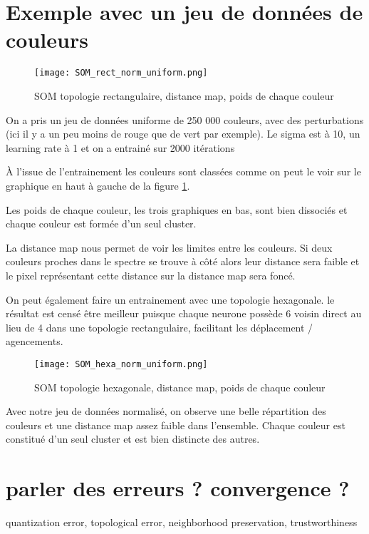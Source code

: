 \documentclass[12pt]{article}
\numberwithin{equation}{section} %
\begin{document}
\newpage
\section{Exemple avec un jeu de données de couleurs}
\begin{figure}[h!] 
	\center
	\label{fig1}
	\texttt{[image: SOM\_rect\_norm\_uniform.png]}
	\caption{SOM topologie rectangulaire, distance map, poids de chaque couleur}
\end{figure}

On a pris un jeu de données uniforme de 250 000 couleurs, avec des perturbations (ici il y a un peu moins de rouge que de vert par exemple). Le sigma est à 10, un learning rate à 1 et on a entrainé sur 2000 itérations

À l'issue de l'entrainement les couleurs sont classées comme on peut le voir sur le graphique en haut à gauche de la figure \ref{fig1}.

Les poids de chaque couleur, les trois graphiques en bas, sont bien dissociés et chaque couleur est formée d'un seul cluster.

La distance map nous permet de voir les limites entre les couleurs. Si deux couleurs proches dans le spectre se trouve à côté alors leur distance sera faible et le pixel représentant cette distance sur la distance map sera foncé.



\newpage
On peut également faire un entrainement avec une topologie hexagonale. le résultat est censé être meilleur puisque chaque neurone possède 6 voisin direct au lieu de 4 dans une topologie rectangulaire, facilitant les déplacement / agencements.
\begin{figure}[h!] 
	\center
	\texttt{[image: SOM\_hexa\_norm\_uniform.png]}
	\caption{SOM topologie hexagonale, distance map, poids de chaque couleur}
\end{figure}

Avec notre jeu de données normalisé, on observe une belle répartition des couleurs et une distance map assez faible dans l'ensemble. Chaque couleur est constitué d'un seul cluster et est bien distincte des autres.




\newpage
\section{parler des erreurs ? convergence ?}


quantization error, topological error, neighborhood preservation, trustworthiness
\end{document}
